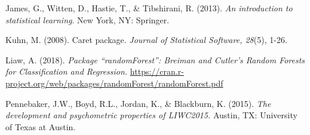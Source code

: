 \documentclass[acmart]{apa6}
\theoremstyle{definition}
\theoremstyle{definition}
\theoremstyle{definition}
\theoremstyle{remark}
\begin{document}
James, G., Witten, D., Hastie, T., \& Tibshirani, R. (2013). \emph{An
introduction to statistical learning}. New York, NY: Springer.

Kuhn, M. (2008). Caret package. \emph{Journal of Statistical Software,
28}(5), 1-26.

Liaw, A. (2018). \emph{Package \enquote{randomForest}: Breiman and
Cutler's Random Forests for Classification and Regression.}
\url{https://cran.r-project.org/web/packages/randomForest/randomForest.pdf}

Pennebaker, J.W., Boyd, R.L., Jordan, K., \& Blackburn, K. (2015).
\emph{The development and psychometric properties of LIWC2015.} Austin,
TX: University of Texas at Austin.

\hypertarget{refs}{}

\endgroup
\end{document}
